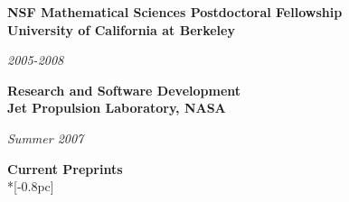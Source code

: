 \documentclass[11pt]{article}
\newcommand{\head}[1]{
  \vspace{10pt}
  {\Large \bf #1} \\*[-0.8pc]
  \underline{\hspace{6.07in}}}
\newcommand{\datedentry}[2]{
  \vspace{5pt}
  \begin{minipage}{5in}{\textbf{#1}}\end{minipage}
  \hfill
  \begin{minipage}{1in}{\hfill\textit{#2}}\end{minipage}
  }
\begin{document}
\datedentry{NSF Mathematical Sciences Postdoctoral Fellowship\\
University of California at Berkeley}{2005-2008}

\vspace{7pt}

\datedentry{Research and Software Development \\
Jet Propulsion Laboratory, NASA}{Summer 2007}
%
%
%
%
%
%
%
%
%
%
%
%
%
%
%


\head{Current Preprints}%

\vspace{.1mm}
\end{document}
